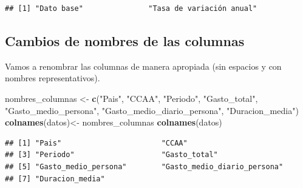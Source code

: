 \documentclass[data,article,submit,moreauthors,pdftex]{Definitions/mdpi}
\newenvironment{Shaded}{\begin{snugshade}}{\end{snugshade}}
\newcommand{\AttributeTok}[1]{\textcolor[rgb]{0.13,0.29,0.53}{#1}}
\newcommand{\CommentTok}[1]{\textcolor[rgb]{0.56,0.35,0.01}{\textit{#1}}}
\newcommand{\DecValTok}[1]{\textcolor[rgb]{0.00,0.00,0.81}{#1}}
\newcommand{\FunctionTok}[1]{\textcolor[rgb]{0.13,0.29,0.53}{\textbf{#1}}}
\newcommand{\NormalTok}[1]{#1}
\newcommand{\OtherTok}[1]{\textcolor[rgb]{0.56,0.35,0.01}{#1}}
\newcommand{\SpecialCharTok}[1]{\textcolor[rgb]{0.81,0.36,0.00}{\textbf{#1}}}
\newcommand{\StringTok}[1]{\textcolor[rgb]{0.31,0.60,0.02}{#1}}
\begin{document}
\begin{verbatim}
## [1] "Dato base"               "Tasa de variación anual"
\end{verbatim}

\begin{Shaded}
\end{Shaded}

\hypertarget{cambios-de-nombres-de-las-columnas}{%
\subsection{Cambios de nombres de las
columnas}\label{cambios-de-nombres-de-las-columnas}}

Vamos a renombrar las columnas de manera apropiada (sin espacios y con
nombres representativos).

\begin{Shaded}
\begin{Highlighting}[]
\NormalTok{nombres\_columnas }\OtherTok{\textless{}{-}} \FunctionTok{c}\NormalTok{(}\StringTok{"Pais"}\NormalTok{, }\StringTok{"CCAA"}\NormalTok{, }\StringTok{"Periodo"}\NormalTok{, }\StringTok{"Gasto\_total"}\NormalTok{, }\StringTok{"Gasto\_medio\_persona"}\NormalTok{, }\StringTok{"Gasto\_medio\_diario\_persona"}\NormalTok{, }\StringTok{"Duracion\_media"}\NormalTok{)}
\FunctionTok{colnames}\NormalTok{(datos)}\OtherTok{\textless{}{-}}\NormalTok{ nombres\_columnas}
\FunctionTok{colnames}\NormalTok{(datos)}
\end{Highlighting}
\end{Shaded}

\begin{verbatim}
## [1] "Pais"                       "CCAA"                      
## [3] "Periodo"                    "Gasto_total"               
## [5] "Gasto_medio_persona"        "Gasto_medio_diario_persona"
## [7] "Duracion_media"
\end{verbatim}
\end{document}
